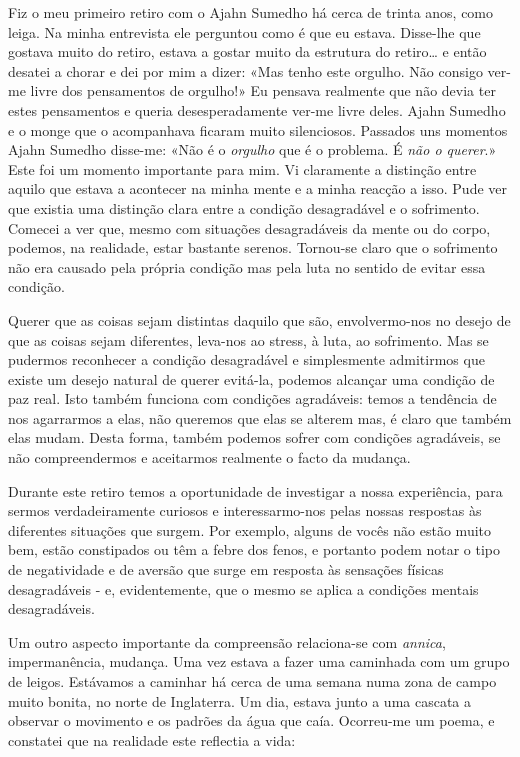 Fiz o meu primeiro retiro com o Ajahn Sumedho há cerca de trinta anos,
como leiga. Na minha entrevista ele perguntou como é que eu estava.
Disse-lhe que gostava muito do retiro, estava a gostar muito da
estrutura do retiro\ldots{} e então desatei a chorar e dei por mim a
dizer: «Mas tenho este orgulho. Não consigo ver-me livre dos pensamentos
de orgulho!» Eu pensava realmente que não devia ter estes pensamentos e
queria desesperadamente ver-me livre deles. Ajahn Sumedho e o monge que
o acompanhava ficaram muito silenciosos. Passados uns momentos Ajahn
Sumedho disse-me: «Não é o \emph{orgulho} que é o problema. É \emph{não
o querer}.» Este foi um momento importante para mim. Vi claramente a
distinção entre aquilo que estava a acontecer na minha mente e a minha
reacção a isso. Pude ver que existia uma distinção clara entre a
condição desagradável e o sofrimento. Comecei a ver que, mesmo com
situações desagradáveis da mente ou do corpo, podemos, na realidade,
estar bastante serenos. Tornou-se claro que o sofrimento não era causado
pela própria condição mas pela luta no sentido de evitar essa condição.

Querer que as coisas sejam distintas daquilo que são, envolvermo-nos no
desejo de que as coisas sejam diferentes, leva-nos ao stress, à luta, ao
sofrimento. Mas se pudermos reconhecer a condição desagradável e
simplesmente admitirmos que existe um desejo natural de querer evitá-la,
podemos alcançar uma condição de paz real. Isto também funciona com
condições agradáveis: temos a tendência de nos agarrarmos a elas, não
queremos que elas se alterem mas, é claro que também elas mudam. Desta
forma, também podemos sofrer com condições agradáveis, se não
compreendermos e aceitarmos realmente o facto da mudança.

Durante este retiro temos a oportunidade de investigar a nossa
experiência, para sermos verdadeiramente curiosos e interessarmo-nos
pelas nossas respostas às diferentes situações que surgem. Por exemplo,
alguns de vocês não estão muito bem, estão constipados ou têm a febre
dos fenos, e portanto podem notar o tipo de negatividade e de aversão
que surge em resposta às sensações físicas desagradáveis - e,
evidentemente, que o mesmo se aplica a condições mentais desagradáveis.

Um outro aspecto importante da compreensão relaciona-se com
\emph{annica}, impermanência, mudança. Uma vez estava a fazer uma
caminhada com um grupo de leigos. Estávamos a caminhar há cerca de uma
semana numa zona de campo muito bonita, no norte de Inglaterra. Um dia,
estava junto a uma cascata a observar o movimento e os padrões da água
que caía. Ocorreu-me um poema, e constatei que na realidade este
reflectia a vida:

